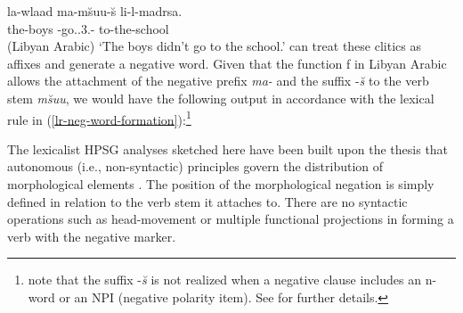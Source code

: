 \documentclass[output=paper
 	        ,biblatex
                ,babelshorthands
                ,newtxmath
                ,draftmode
                ,colorlinks, citecolor=brown
]{langscibook}
\begin{document}
\begin{exe}
\begin{xlist}
\begin{exe}
\begin{xlist}
\ea
\gll la-wlaad ma-m\u{s}uu-\u{s} li-l-madrsa. \\
     the-boys \NEG-go.\pst.3.\pl-\NEG{} to-the-school\\\hfill(Libyan Arabic)
\glt `The boys didn't go to the school.'
\z
%
 can treat these clitics as affixes and generate
a negative word. Given that the function f in Libyan Arabic allows
the attachment of the negative prefix \textit{ma-} and the suffix -\textit{\u{s}} to the verb
stem \emph{m\u{s}uu}, we would have the following output in accordance
with the lexical rule in (\ref{lr-neg-word-formation}):\footnote{%
   \citet{BK:12} note that the suffix -\textit{\u{s}} is not realized when a negative clause
   includes an n-word or an NPI (negative polarity item). See \citet{BK:12} for further details.}
%
%


\ea
\z

The lexicalist HPSG analyses sketched here have been built upon the
thesis that autonomous (i.e., non-syntactic) principles govern the
distribution of morphological elements \citep{BM:95}.
The position of the morphological negation is simply
defined in relation to
the verb stem it attaches to. There are no syntactic operations such
as head-movement or multiple functional projections in forming
a verb with the negative marker.




\end{xlist}
\end{exe}
\end{xlist}
\end{exe}
\end{document}

